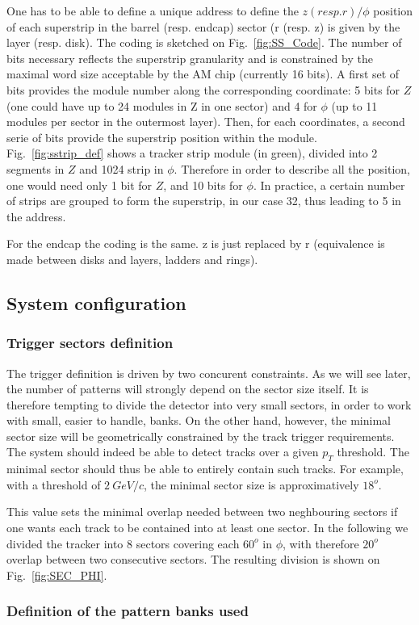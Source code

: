 \noindent One has to be able to define a unique address to define the $z (resp. r)/\phi$ position of each superstrip in the barrel (resp. endcap) sector (r (resp. z) is given by the layer (resp. disk). The coding is sketched on Fig.~\ref{fig:SS_Code}. The number of bits necessary reflects the superstrip granularity and is constrained by the maximal word size acceptable by the AM chip (currently 16 bits). A first set of bits provides the module number along the corresponding coordinate: 5 bits for $Z$ (one could have up to 24 modules in Z in one sector) and 4 for $\phi$ (up to 11 modules per sector in the outermost layer). Then, for each coordinates, a second serie of bits provide the superstrip position within the module. Fig.~\ref{fig:sstrip_def} shows a tracker strip module (in green), divided into 2 segments in $Z$ and 1024 strip in $\phi$. Therefore in order to describe all the position, one would need only 1 bit for $Z$, and 10 bits for $\phi$. In practice, a certain number of strips are grouped to form the superstrip, in our case 32, thus leading to 5 in the address.   

\noindent For the endcap the coding is the same. z is just replaced by r (equivalence is made between disks and layers, ladders and rings). 

\subsection{System configuration}

\subsubsection{Trigger sectors definition}


\noindent The trigger definition is driven by two concurent constraints. As we will see later, the number of patterns will strongly depend on the sector size itself. It is therefore tempting to divide the detector into very small sectors, in order to work with small, easier to handle, banks. On the other hand, however, the minimal sector size will be geometrically constrained by the track trigger requirements. The system should indeed be able to detect tracks over a given $p_T$ threshold. The minimal sector should thus be able to entirely contain such tracks. For example, with a threshold of $2~GeV/c$, the minimal sector size is approximatively $18^{o}$.

\noindent This value sets the minimal overlap needed between two neghbouring sectors if one wants each track to be contained into at least one sector. In the following we divided the tracker into 8 sectors covering each $60^{o}$ in $\phi$, with therefore $20^{o}$ overlap between two consecutive sectors. The resulting division is shown on Fig.~\ref{fig:SEC_PHI}.


\subsubsection{Definition of the pattern banks used}



\clearpage
